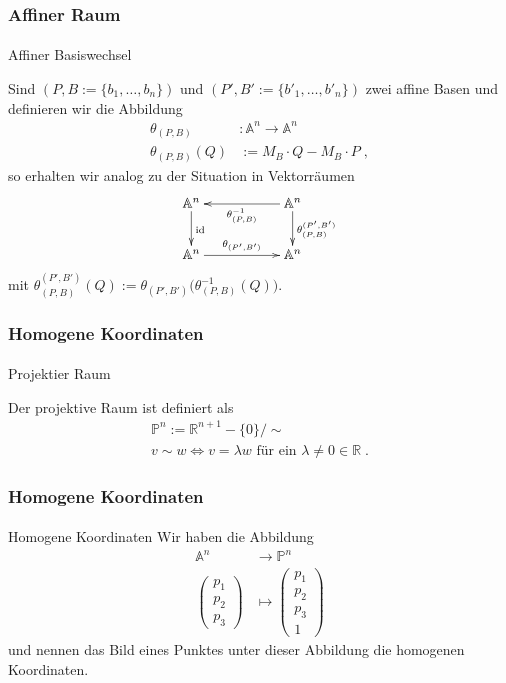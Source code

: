 \documentclass{beamer}
\begin{document}
\begin{frame}
    \frametitle{Affiner Raum}
\framesubtitle{}
\begin{block}{Affiner Basiswechsel}

Sind $(P,B:= \{b_1, \hdots , b_n \})$  und $(P',B':= \{b'_1, \hdots , b'_n \})$ zwei affine Basen  und definieren wir 
die Abbildung
\begin{align*}
\theta_{(P,B)} & :  \mathbb{A}^n \to \mathbb{A}^n \\
\theta_{(P,B)}(Q) & := M_B \cdot Q - M_B \cdot P \; ,
\end{align*}
so erhalten wir analog zu der Situation in Vektorräumen
\begin{align*}
\xymatrix{
\mathbb{A}^n  \ar[d]^{\text{id}} &  & \ar[ll]^{\theta_{(P,B)}^{-1}} \mathbb{A}^n \ar[d]^{\theta_{(P,B)}^{(P',B')}} \\
\mathbb{A}^n  \ar[rr]^{\theta_{(P',B')}} & &  \mathbb{A}^n
}
\end{align*}
mit $\theta_{(P,B)}^{(P',B')} (Q) :=   \theta_{(P',B')} \biggl ( \theta_{(P,B)}^{-1} (Q) \biggr)$.
\end{block}

\end{frame}



\begin{frame}
    \frametitle{Homogene Koordinaten}
\framesubtitle{}
\begin{block}{Projektier Raum}

Der projektive  Raum ist definiert als
\begin{align*}
\mathbb{P}^n := \mathbb{R}^{n+1} - \{ 0\} / \sim \\
v \sim w \Leftrightarrow v = \lambda w \text{ für ein } \lambda \neq 0 \in \mathbb{R} \; . 
\end{align*}
\end{block}
\end{frame}

\begin{frame}
    \frametitle{Homogene Koordinaten}
\framesubtitle{}
\begin{block}{Homogene Koordinaten}
Wir haben die Abbildung
\begin{align*}
\mathbb{A}^n & \to \mathbb{P}^n \\
\begin{pmatrix} p_1 \\ p_2 \\ p_3 \end{pmatrix} & \mapsto \begin{pmatrix} p_1 \\ p_2 \\ p_3  \\  1\end{pmatrix} 
\end{align*}
und nennen das Bild eines Punktes unter dieser Abbildung die homogenen Koordinaten.
\end{block}
\end{frame}
\end{document}
